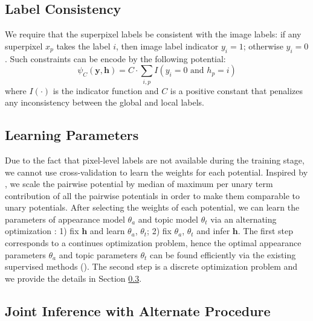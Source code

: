 \subsection{Label Consistency}
We require that the superpixel labels be consistent with the image labels: if any superpixel $x_p$ takes the label $i$, then image label indicator $y_i=1$; otherwise $y_i=0$. Such constraints can be encode by the following potential:
\begin{equation}
    \psi_{C}(\boldsymbol{y},\boldsymbol{h}) =
    C \cdot \sum_{i,p} I(y_i=0 \mbox{ and } h_p=i)
\end{equation}
where $I(\cdot)$ is the indicator function and $C$ is a positive constant that penalizes any inconsistency between the global and local labels.

\subsection{Learning Parameters}
Due to the fact that pixel-level labels are not available during the training stage, we cannot use cross-validation \cite{kohli2009robust} to learn the weights for each potential. Inspired by \cite{vezhnevets2011weakly}, we scale the pairwise potential by median of maximum per unary term contribution of all the pairwise potentials in order to make them comparable to unary potentials. After selecting the weights of each potential, we can learn the parameters of appearance model $\theta_a$ and topic model $\theta_t$ via an alternating optimization \cite{vezhnevets2011weakly}: 1) fix $\boldsymbol{h}$ and learn $\theta_a$, $\theta_t$; 2) fix $\theta_a$, $\theta_t$ and infer $\boldsymbol{h}$. The first step corresponds to a continues optimization problem, hence the optimal appearance parameters $\theta_a$ and topic parameters $\theta_t$ can be found efficiently via the existing supervised methods (\eg \cite{shotton2006textonboost}). The second step is a discrete optimization problem and we provide the details in Section \ref{sec:inference}.

\subsection{Joint Inference with Alternate Procedure}
\label{sec:inference}


